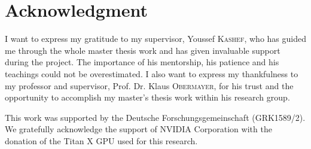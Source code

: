 %
\chapter*{Acknowledgment}
\label{sec:acknowledgement}

I want to express my gratitude to my supervisor, Youssef \textsc{Kashef}, who has guided me through the whole master thesis work and has given invaluable support during the project. The importance of his mentorship, his patience and his teachings could not be overestimated. I also want to express my thankfulness to my professor and supervisor, Prof. Dr. Klaus \textsc{Obermayer}, for his trust and the opportunity to accomplish my master's thesis work within his research group.

This work was supported by the Deutsche Forschungsgemeinschaft (GRK1589/2). We gratefully acknowledge the support of NVIDIA Corporation with the donation of the Titan X GPU used for this research.

